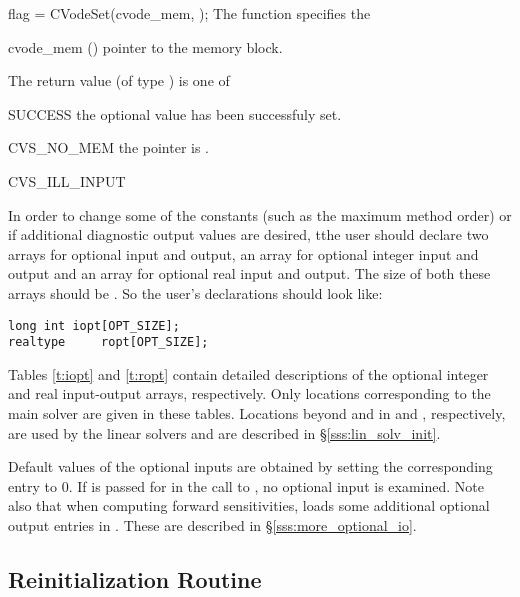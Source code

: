 {}
{
flag = CVodeSet(cvode\_mem, );
}
{
  The function  specifies the
}
{
  \begin{args}
  \item[cvode\_mem] ()
    pointer to the {\cvodes} memory block.
  \item[]
    
  \end{args}
}
{
  The return value  (of type ) is one of
  \begin{args}
  \item[SUCCESS] 
    the optional value has been successfuly set.
  \item[CVS\_NO\_MEM]
    the  pointer is .
  \item[CVS\_ILL\_INPUT]
    
  \end{args}
}
{}

In order to change some of the {\cvodes} constants (such as the maximum method order) 
or if additional diagnostic output values are desired, tthe user should declare two 
arrays for optional input and output, an  array for optional integer 
input and output and an  array for optional real input and output. 
The size of both these arrays should be .
So the user's declarations should look like:
\begin{verbatim}
long int iopt[OPT_SIZE];
realtype     ropt[OPT_SIZE];
\end{verbatim}
Tables \ref{t:iopt} and \ref{t:ropt} contain 
detailed descriptions of the optional integer and real input-output arrays,
respectively. Only locations corresponding to the main {\cvodes} solver are 
given in these tables. Locations beyond  and
 in  and , respectively, are used
by the linear solvers and are described in \S\ref{sss:lin_solv_init}.

Default values of the optional inputs are obtained by setting the corresponding
entry to 0. If  is passed for  in the call to ,
no optional input is examined.
Note also that when computing forward sensitivities, {\cvodes} loads some
additional optional output entries in . 
These are described in \S\ref{sss:more_optional_io}.
\subsection{{\cvodes} Reinitialization Routine}\label{sss:cvreinit}

